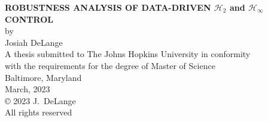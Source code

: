 \thispagestyle{empty}
\baselineskip=18pt
\begin{center}
\vspace*{3\baselineskip}
%
{\bfseries ROBUSTNESS ANALYSIS OF DATA-DRIVEN $\mathcal{H}_{2}$ and $\mathcal{H}_{\infty}$ CONTROL}\\[4\baselineskip]
%
by\\
%
Josiah DeLange\\[3\baselineskip]
%
%
A thesis submitted to The Johns Hopkins University in conformity \\ 
with the requirements for the degree of Master of Science\\[3\baselineskip]
%
Baltimore, Maryland\\
March, 2023\\[6\baselineskip]
%

{\copyright{} 2023 J.~DeLange\\
All rights reserved}
%
\end{center}
%
\baselineskip=24pt
\newpage 